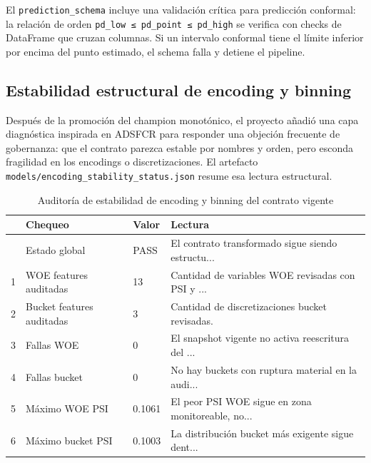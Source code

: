 \documentclass[
  spanish,
  11pt,
  letterpaper,
]{scrbook}
\theoremstyle{plain}
\theoremstyle{remark}
\begin{document}
El \texttt{prediction\_schema} incluye una validación crítica para
predicción conformal: la relación de orden
\texttt{pd\_low\ ≤\ pd\_point\ ≤\ pd\_high} se verifica con checks de
DataFrame que cruzan columnas. Si un intervalo conformal tiene el límite
inferior por encima del punto estimado, el schema falla y detiene el
pipeline.

\subsection{Estabilidad estructural de encoding y
binning}\label{estabilidad-estructural-de-encoding-y-binning}

Después de la promoción del champion monotónico, el proyecto añadió una
capa diagnóstica inspirada en ADSFCR para responder una objeción
frecuente de gobernanza: que el contrato parezca estable por nombres y
orden, pero esconda fragilidad en los encodings o discretizaciones. El
artefacto \texttt{models/encoding\_stability\_status.json} resume esa
lectura estructural.

{

\begin{longtable}[]{@{}llll@{}}

\caption{\label{tbl-encoding-stability}Auditoría de estabilidad de
encoding y binning del contrato vigente}

\tabularnewline

\toprule\noalign{}
& Chequeo & Valor & Lectura \\
\midrule\noalign{}
\endhead
\bottomrule\noalign{}
\endlastfoot
0 & Estado global & PASS & El contrato transformado sigue siendo
estructu... \\
1 & WOE features auditadas & 13 & Cantidad de variables WOE revisadas
con PSI y ... \\
2 & Bucket features auditadas & 3 & Cantidad de discretizaciones bucket
revisadas. \\
3 & Fallas WOE & 0 & El snapshot vigente no activa reescritura del
... \\
4 & Fallas bucket & 0 & No hay buckets con ruptura material en la
audi... \\
5 & Máximo WOE PSI & 0.1061 & El peor PSI WOE sigue en zona
monitoreable, no... \\
6 & Máximo bucket PSI & 0.1003 & La distribución bucket más exigente
sigue dent... \\

\end{longtable}

}
\end{document}
